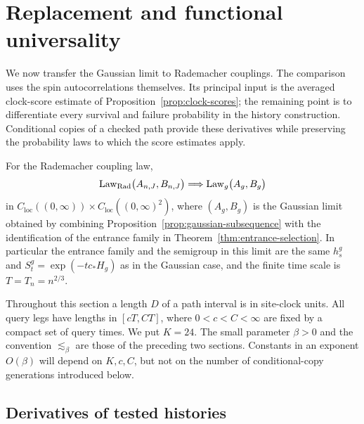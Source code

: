 \section{Replacement and functional universality}\label{sec:replacement}

We now transfer the Gaussian limit to Rademacher couplings.  The comparison
uses the spin autocorrelations themselves.  Its principal input is the
averaged clock-score estimate of Proposition~\ref{prop:clock-scores}; the remaining
point is to differentiate every survival and failure probability in the
history construction.  Conditional copies of a checked path provide these
derivatives while preserving the probability laws to which the score
estimates apply.

\begin{proposition}\label{prop:universality}
For the Rademacher coupling law,
\[
 \operatorname{Law}_{\mathrm{Rad}}\bigl(A_{n,J},B_{n,J}\bigr)
 \Longrightarrow \operatorname{Law}_g\bigl(A_g,B_g\bigr)
\]
in
$C_{\mathrm{loc}}((0,\infty))\times
C_{\mathrm{loc}}((0,\infty)^2)$, where $(A_g,B_g)$ is the Gaussian limit
obtained by combining Proposition~\ref{prop:gaussian-subsequence} with the
identification of the entrance family in Theorem~\ref{thm:entrance-selection}.
In particular the entrance family and the semigroup in this limit are the same $h_s^g$ and
$S_t^g=\exp(-t c_*H_g)$ as in the Gaussian case, and the finite time scale is
$T=T_n=n^{2/3}$.
\end{proposition}

Throughout this section a length $D$ of a path interval is in site-clock
units.  All query legs have lengths in $[cT,CT]$, where $0<c<C<\infty$ are
fixed by a compact set of query times.  We put $K=24$.  The small parameter
$\beta>0$ and the convention $\lesssim_\beta$ are those of the preceding two
sections.  Constants in an exponent $O(\beta)$ will depend on $K,c,C$, but
not on the number of conditional-copy generations introduced below.

\subsection{Derivatives of tested histories}

